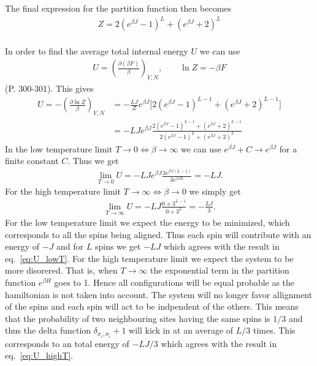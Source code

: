 \documentclass[reprint, amsmath, amssymb, aps, onecolumn]{revtex4-2}
\begin{document}
The final expression for the partition function then becomes
\begin{align}
  Z = 2(e^{\beta J} - 1)^L + ( e^{\beta J} + 2)^L
  \label{eq:Z}
\end{align}
\\
In order to find the average total internal energy $U$ we can use 
\begin{align*}
  U = \left(\frac{\partial (\beta F)}{\beta}\right)_{V,N}, \qquad \ln{Z} = -\beta F
\end{align*}
\cite{Svendsen}(P. 300-301). This gives
\begin{align}
  U = -\left(\frac{\partial \ln{Z}}{\beta}\right)_{V,N} &= -\frac{LJ}{Z}e^{\beta J} \Big[2(e^{\beta J} - 1)^{L-1} + ( e^{\beta J} + 2)^{L-1} \Big] \nonumber\\
  &= -LJe^{\beta J} \frac{2(e^{\beta J} - 1)^{L-1} + ( e^{\beta J} + 2)^{L-1}}{2(e^{\beta J} - 1)^L + ( e^{\beta J} + 2)^L}
\end{align}
In the low temperature limit $T \to 0 \Leftrightarrow \beta \to \infty$ we can use $e^{\beta J} + C \to e^{\beta J}$ for a finite constant $C$. Thus we get 
\begin{align}
  \lim_{T\to 0} U = -LJ e^{\beta J}\frac{3e^{\beta J (L-1)}}{3e^{\beta J L}} = -LJ.
  \label{eq:U_lowT}
\end{align}
For the high temperature limit $T \to \infty \Leftrightarrow \beta \to 0$  we simply get
\begin{align}
  \lim_{T\to \infty} U = -LJ \frac{0 + 3^{L-1}}{0 + 3^L} = - \frac{LJ}{3}.
  \label{eq:U_highT}
\end{align}
For the low temperature limit we expect the energy to be minimized, which corresponds to all the spins being aligned. Thus each spin will contribute with an energy of $-J$ and for $L$ spins we get $-LJ$ which agrees with the result in eq.~\eqref{eq:U_lowT}. For the high temperature limit we expect the system to be more disorered. That is, when $T\to\infty$ the exponential term in the partition function $e^{\beta H}$ goes to 1. Hence all configurations will be equal probable as the hamiltonian is not taken into account. The system will no longer favor allignment of the spins and each spin will act to be indpendent of the others. This means that the probability of two neighbouring sites having the same spins is $1/3$ and thus the delta function $\delta_{\sigma_i, \sigma_i}+1$ will kick in at an average of $L/3$ times. This corresponds to an total energy of $-LJ/3$ which agrees with the result in eq.~\eqref{eq:U_highT}.
%
%
\end{document}
